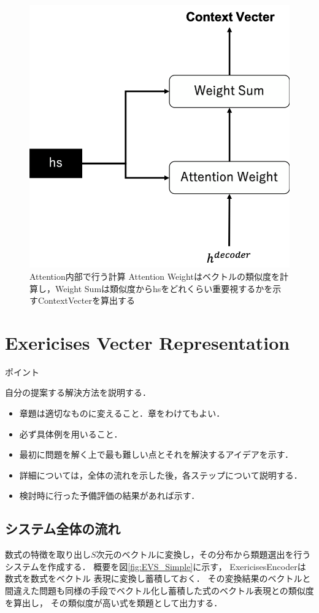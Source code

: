 \documentclass[a4j,11pt,report]{jsbook}
\newcommand{\point}[1]{
\begin{itembox}[l]{ポイント}
  #1
\end{itembox}
}
\begin{document}
\begin{center}
  \begin{figure}[ht]
    \centering
    \includegraphics[width=0.5\linewidth]{image/attention_layer.png}
    \caption{Attention内部で行う計算  Attention Weightはベクトルの類似度を計算し，Weight Sumは類似度からhsをどれくらい重要視するかを示すContextVecterを算出する}
    \label{fig:Attention_layer}
  \end{figure}
\end{center}
\fi


\chapter{Exericises Vecter Representation\label{ch:method}}
\point{
自分の提案する解決方法を説明する．
\begin{itemize}
  \item 章題は適切なものに変えること．章をわけてもよい．
  \item 必ず具体例を用いること．
  \item 最初に問題を解く上で最も難しい点とそれを解決するアイデアを示す．
  \item 詳細については，全体の流れを示した後，各ステップについて説明する．
  \item 検討時に行った予備評価の結果があれば示す．
\end{itemize}
}
\fi

\section{システム全体の流れ}

数式の特徴を取り出し$S$次元のベクトルに変換し，その分布から類題選出を行うシステムを作成する．
概要を図\ref{fig:EVS_Simple}に示す，
ExericisesEncoderは数式を数式をベクトル 表現に変換し蓄積しておく．
その変換結果のベクトルと間違えた問題も同様の手段でベクトル化し蓄積した式のベクトル表現との類似度を算出し，
その類似度が高い式を類題として出力する．
\end{document}
